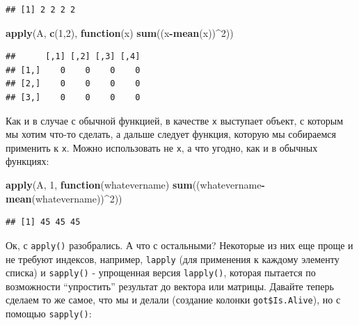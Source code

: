 \documentclass[]{book}
\newenvironment{Shaded}{\begin{snugshade}}{\end{snugshade}}
\newcommand{\KeywordTok}[1]{\textcolor[rgb]{0.13,0.29,0.53}{\textbf{#1}}}
\newcommand{\DecValTok}[1]{\textcolor[rgb]{0.00,0.00,0.81}{#1}}
\newcommand{\StringTok}[1]{\textcolor[rgb]{0.31,0.60,0.02}{#1}}
\newcommand{\OtherTok}[1]{\textcolor[rgb]{0.56,0.35,0.01}{#1}}
\newcommand{\ControlFlowTok}[1]{\textcolor[rgb]{0.13,0.29,0.53}{\textbf{#1}}}
\newcommand{\OperatorTok}[1]{\textcolor[rgb]{0.81,0.36,0.00}{\textbf{#1}}}
\newcommand{\NormalTok}[1]{#1}
\begin{document}
\begin{verbatim}
## [1] 2 2 2 2
\end{verbatim}

\begin{Shaded}
\begin{Highlighting}[]
\KeywordTok{apply}\NormalTok{(A, }\KeywordTok{c}\NormalTok{(}\DecValTok{1}\NormalTok{,}\DecValTok{2}\NormalTok{), }\ControlFlowTok{function}\NormalTok{(x) }\KeywordTok{sum}\NormalTok{((x}\OperatorTok{-}\KeywordTok{mean}\NormalTok{(x))}\OperatorTok{^}\DecValTok{2}\NormalTok{))}
\end{Highlighting}
\end{Shaded}

\begin{verbatim}
##      [,1] [,2] [,3] [,4]
## [1,]    0    0    0    0
## [2,]    0    0    0    0
## [3,]    0    0    0    0
\end{verbatim}

Как и в случае с обычной функцией, в качестве \texttt{x} выступает
объект, с которым мы хотим что-то сделать, а дальше следует функция,
которую мы собираемся применить к \texttt{х}. Можно использовать не
\texttt{х}, а что угодно, как и в обычных функциях:

\begin{Shaded}
\begin{Highlighting}[]
\KeywordTok{apply}\NormalTok{(A, }\DecValTok{1}\NormalTok{, }\ControlFlowTok{function}\NormalTok{(whatevername) }\KeywordTok{sum}\NormalTok{((whatevername}\OperatorTok{-}\KeywordTok{mean}\NormalTok{(whatevername))}\OperatorTok{^}\DecValTok{2}\NormalTok{))}
\end{Highlighting}
\end{Shaded}

\begin{verbatim}
## [1] 45 45 45
\end{verbatim}

Ок, с \texttt{apply()} разобрались. А что с остальными? Некоторые из них
еще проще и не требуют индексов, например, \texttt{lapply} (для
применения к каждому элементу списка) и \texttt{sapply()} - упрощенная
версия \texttt{lapply()}, которая пытается по возможности ``упростить''
результат до вектора или матрицы. Давайте теперь сделаем то же самое,
что мы и делали (создание колонки \texttt{got\$Is.Alive}), но с помощью
\texttt{sapply()}:

\begin{Shaded}
\end{Shaded}
\end{document}
